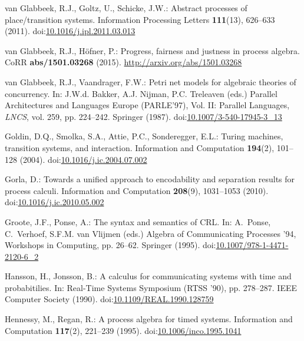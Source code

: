 \documentclass[smallcondensed]{svjour3}
\providecommand{\urlalt}[2]{\href{#1}{#2}}
\providecommand{\doi}[1]{doi:\urlalt{http://dx.doi.org/#1}{#1}}
\begin{document}
\begin{thebibliography}{10}
van Glabbeek, R.J., Goltz, U., Schicke, J.W.: Abstract processes of
  place/transition systems.
\newblock Information Processing Letters
  \textbf{\hspace{-1pt}111\hspace{-1pt}}(\hspace{-1pt}13\hspace{-1pt}),
  626--633 (\hspace{-1pt}2011\hspace{-1pt}).
\newblock \doi{10.1016/j.ipl.2011.03.013}

van Glabbeek, R.J., H{\"o}fner, P.: Progress, fairness and justness in process
  algebra.
\newblock CoRR \textbf{{\normalfont abs/1501.03268}} (2015).
\newblock \urlprefix\url{http://arxiv.org/abs/1501.03268}

van Glabbeek, R.J., Vaandrager, F.W.: Petri net models for algebraic theories
  of concurrency.
\newblock In: J.W.d. Bakker, A.J. Nijman, P.C. Treleaven (eds.) Parallel
  Architectures and Languages Europe (PARLE'97), Vol. II: Parallel Languages,
  \emph{\rm LNCS}, vol. 259, pp. 224--242. Springer (1987).
\newblock \doi{10.1007/3-540-17945-3\_13}

Goldin, D.Q., Smolka, S.A., Attie, P.C., Sonderegger, E.L.: Turing machines,
  transition systems, and interaction.
\newblock Information and Computation \textbf{194}(2), 101--128 (2004).
\newblock \doi{10.1016/j.ic.2004.07.002}

Gorla, D.: Towards a unified approach to encodability and separation results
  for process calculi.
\newblock Information and Computation \textbf{208}(9), 1031--1053 (2010).
\newblock \doi{10.1016/j.ic.2010.05.002}

Groote, J.F., Ponse, A.: The syntax and semantics of {CRL}.
\newblock In: A.~Ponse, C.~Verhoef, S.F.M. {van Vlijmen} (eds.) Algebra of
  Communicating Processes '94, Workshops in Computing, pp. 26--62. Springer
  (1995).
\newblock \doi{10.1007/978-1-4471-2120-6\_2}

Hansson, H., Jonsson, B.: A calculus for communicating systems with time and
  probabitilies.
\newblock In: Real-Time Systems Symposium (RTSS '90), pp. 278--287. IEEE
  Computer Society (1990).
\newblock \doi{10.1109/REAL.1990.128759}

Hennessy, M., Regan, R.: A process algebra for timed systems.
\newblock Information and Computation \textbf{117}(2), 221--239 (1995).
\newblock \doi{10.1006/inco.1995.1041}


\end{thebibliography}
\end{document}
